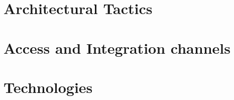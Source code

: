 \documentclass{article}
\begin{document}
	\section{Architectural Tactics}%
	\section{Access and Integration channels}%
	\section{Technologies}%
	
	
	
	
	
	
\end{document}
